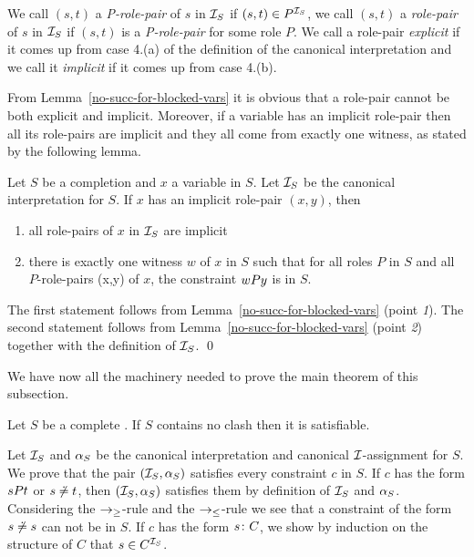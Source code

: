 We call $(s,t)$  a {\em P-role-pair} of $s$ in ${{\cal I}_S}$ if
$(s,t) \in P^{{\cal I}_S}$, we call $(s,t)$  a {\em role-pair} of $s$ in ${{\cal I}_S}$ if
$(s,t)$ is a {\em P-role-pair} for some role $P$.
We call a role-pair {\em explicit} if it comes up from case 4.(a)
of the definition of the canonical interpretation and
we call it {\em implicit} if it comes up from case 4.(b).

From Lemma~\ref{no-succ-for-blocked-vars} it is obvious that a role-pair
cannot be both explicit and implicit.
Moreover, if
a variable has an implicit
role-pair then all its role-pairs are implicit and they all come
from exactly one witness, as stated by the following lemma.

\begin{lemma} \label{no-ex-im-mix}
  Let $S$ be a completion and $x$ a variable in $S$.
  Let ${{\cal I}_S}$ be the canonical interpretation for $S$.
  If $x$ has an implicit role-pair $(x,y)$, then
    \begin{enumerate}
      \item all role-pairs of $x$ in ${{\cal I}_S}$ are implicit
      \item there is exactly one witness $w$ of $x$ in $S$ such that
            for all roles $P$ in $S$ and
            all $P$-role-pairs (x,y) of $x$,  the
            constraint $wPy$ is in $S$.
    \end{enumerate}
\end{lemma}
\proof
The first statement follows from Lemma~\ref{no-succ-for-blocked-vars} (point
{\it 1\/}).  The second statement follows from
Lemma~\ref{no-succ-for-blocked-vars} (point {\it 2\/}) together with the
definition of ${{\cal I}_S}$.
\qed

We have now all the machinery needed to prove the main theorem of this
subsection. 

\begin{theorem}\label{completeness}
Let $S$ be a complete \cs. If $S$ contains no clash then it is satisfiable.  
\end{theorem} 
\proof
%
Let ${{\cal I}_S}$ and ${\alpha_S}$ be the canonical interpretation and canonical
${\cal I}$-assignment for $S$.
We prove that the pair $({{\cal I}_S},{\alpha_S})$ satisfies every constraint $c$ in $S$.
If $c$ has the form $ sPt$ or ${s \not\doteq t}$, 
then $({{\cal I}_S},{\alpha_S})$ satisfies them by definition of ${{\cal I}_S}$ and ${\alpha_S}$.
Considering the $\rightarrow_\geq$-rule and the $\rightarrow_\leq$-rule
we see that a constraint of the form ${s \not\doteq s}$ can not be in $S$.
If $c$ has the form $s\colon C$, we show by induction on the structure
of $C$ that $s \in  C^{{\cal I}_S}$.

